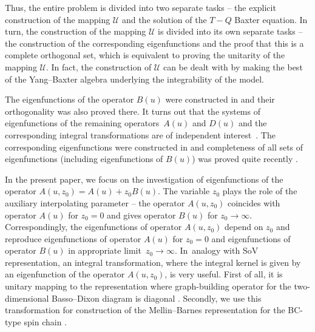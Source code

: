 \documentclass[10pt,a4paper]{amsart}
\numberwithin{equation}{section}
\begin{document}
Thus, the entire problem is divided into two separate tasks -- the explicit
construction of the mapping $\mathcal{U}$ and the solution of the $T-Q$ Baxter equation.
In turn, the construction of the mapping $\mathcal{U}$ is divided into its own separate tasks -- the construction of the corresponding eigenfunctions and the proof that this is a complete orthogonal set, which is equivalent to proving the unitarity of the mapping $\mathcal{U}$. In fact, the construction of $\mathcal{U}$ can be dealt with by making the best of the Yang--Baxter algebra underlying the integrability of the model.

The eigenfunctions of the operator $B(u)$ were constructed in \cite{DKM} and
their orthogonality was also proved there.
It turns out that the systems of eigenfunctions of the remaining operators~$A(u)$
and $D(u)$ and the corresponding integral transformations are of
independent interest~\mbox{\cite{BDM,DKO, L4}}. The corresponding eigenfunctions were
constructed in \cite{DM2} and completeness of all sets of
eigenfunctions (including eigenfunctions of $B(u)$) was proved quite recently \cite{M}.

In the present paper, we focus on the investigation of eigenfunctions of the operator
$A(u,z_0) = A(u)+z_0 B(u)$.
The variable $z_0$ plays the role of the auxiliary interpolating parameter --
the operator $A(u,z_0)$ coincides with operator $A(u)$ for $z_0=0$ and gives operator $B(u)$ for $z_0 \to \infty$. Correspondingly,
the eigenfunctions of operator $A(u,z_0)$ depend on $z_0$ and reproduce
eigenfunctions of operator $A(u)$ for $z_0=0$ and eigenfunctions of operator
$B(u)$ in appropriate limit~${z_0 \to \infty}$.
In~analogy with SoV representation, an integral transformation,
where the integral kernel is given by an eigenfunction of the
operator $A(u,z_0)$, is very useful.
First of all, it is unitary mapping to the representation where graph-building operator
for the two-dimensional Basso--Dixon diagram is diagonal \cite{DKO}.
Secondly, we use this transformation for construction of the Mellin--Barnes representation for the BC-type spin chain \cite{ADV2}.
\end{document}
